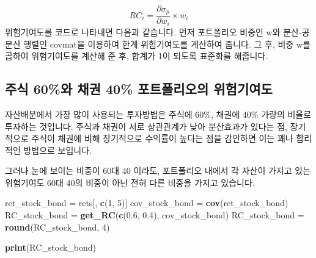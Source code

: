 \documentclass[12pt,]{book}
\newenvironment{Shaded}{\begin{snugshade}}{\end{snugshade}}
\newcommand{\ControlFlowTok}[1]{\textcolor[rgb]{0.13,0.29,0.53}{\textbf{#1}}}
\newcommand{\DecValTok}[1]{\textcolor[rgb]{0.00,0.00,0.81}{#1}}
\newcommand{\FloatTok}[1]{\textcolor[rgb]{0.00,0.00,0.81}{#1}}
\newcommand{\KeywordTok}[1]{\textcolor[rgb]{0.13,0.29,0.53}{\textbf{#1}}}
\newcommand{\NormalTok}[1]{#1}
\newcommand{\OperatorTok}[1]{\textcolor[rgb]{0.81,0.36,0.00}{\textbf{#1}}}
\newcommand{\StringTok}[1]{\textcolor[rgb]{0.31,0.60,0.02}{#1}}
\begin{document}
\[RC_i = \frac{\partial\sigma_p}{\partial w_i} \times w_i\]
위험기여도를 코드로 나타내면 다음과 같습니다. 먼저 포트폴리오 비중인 w와 분산-공분산 행렬인 covmat을 이용하여 한계 위험기여도를 계산하여 줍니다. 그 후, 비중 w를 곱하여 위험기여도를 계산해 준 후, 합계가 1이 되도록 표준화를 해줍니다.

\begin{Shaded}
\end{Shaded}

\hypertarget{section-77}{%
\subsection{주식 60\%와 채권 40\% 포트폴리오의 위험기여도}\label{section-77}}

자산배분에서 가장 많이 사용되는 투자방법은 주식에 60\%, 채권에 40\% 가량의 비율로 투자하는 것입니다. 주식과 채권이 서로 상관관계가 낮아 분산효과가 있다는 점, 장기적으로 주식이 채권에 비해 장기적으로 수익률이 높다는 점을 감안하면 이는 꽤나 합리적인 방법으로 보입니다.

그러나 눈에 보이는 비중이 60대 40 이라도, 포트폴리오 내에서 각 자산이 가지고 있는 위험기여도 60대 40의 비중이 아닌 전혀 다른 비중을 가지고 있습니다.

\begin{Shaded}
\begin{Highlighting}[]
\NormalTok{ret_stock_bond =}\StringTok{ }\NormalTok{rets[, }\KeywordTok{c}\NormalTok{(}\DecValTok{1}\NormalTok{, }\DecValTok{5}\NormalTok{)]}
\NormalTok{cov_stock_bond =}\StringTok{ }\KeywordTok{cov}\NormalTok{(ret_stock_bond)}
\NormalTok{RC_stock_bond =}\StringTok{ }\KeywordTok{get_RC}\NormalTok{(}\KeywordTok{c}\NormalTok{(}\FloatTok{0.6}\NormalTok{, }\FloatTok{0.4}\NormalTok{), cov_stock_bond)}
\NormalTok{RC_stock_bond =}\StringTok{ }\KeywordTok{round}\NormalTok{(RC_stock_bond, }\DecValTok{4}\NormalTok{)}

\KeywordTok{print}\NormalTok{(RC_stock_bond)}
\end{Highlighting}
\end{Shaded}
\end{document}
